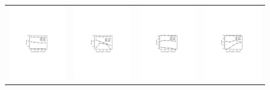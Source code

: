 \begin{figure}[htp]
\hspace*{-.4cm}
\centering
\begin{tabular}{c c c c}
  \begin{minipage}{3.76cm}
  \includegraphics[width=3.725cm]{figures/flickrUpdate}
  \end{minipage}
  &
  \begin{minipage}{3.76cm}
  \includegraphics[width=3.725cm]{figures/dblpUpdate}
  \end{minipage}
  &
  \begin{minipage}{3.76cm}
  \includegraphics[width=3.725cm]{figures/tencentUpdate}
  \end{minipage}
  &
  \begin{minipage}{3.76cm}
  \includegraphics[width=3.725cm]{figures/dbpediaUpdate}

\end{minipage}
\end{tabular}
\end{figure}
